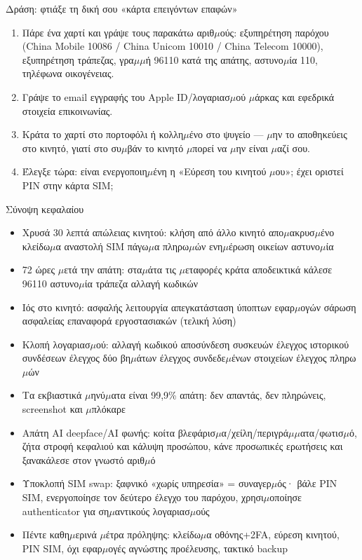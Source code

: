 \begin{tcbpractice}{Δράση: φτιάξε τη δική σου «κάρτα επειγόντων επαφών»}
\begin{enumerate}
  \item Πάρε ένα χαρτί και γράψε τους παρακάτω αριθ$\mu$ούς: εξυπηρέτηση παρόχου (China Mobile 10086 / China Unicom 10010 / China Telecom 10000), εξυπηρέτηση τράπεζας, γρα$\mu$$\mu$ή 96110 κατά της απάτης, αστυνο$\mu$ία 110, τηλέφωνα οικογένειας.
  \item Γράψε το email εγγραφής του Apple ID/λογαριασ$\mu$ού $\mu$άρκας και εφεδρικά στοιχεία επικοινωνίας.
  \item Κράτα το χαρτί στο πορτοφόλι ή κολλη$\mu$ένο στο ψυγείο — $\mu$ην το αποθηκεύεις στο κινητό, γιατί στο συ$\mu$βάν το κινητό $\mu$πορεί να $\mu$ην είναι $\mu$αζί σου.
  \item Έλεγξε τώρα: είναι ενεργοποιη$\mu$ένη η «Εύρεση του κινητού $\mu$ου»; έχει οριστεί PIN στην κάρτα SIM;
\end{enumerate}

\end{tcbpractice}

\begin{tcbsummary}{Σύνοψη κεφαλαίου}
\begin{itemize}
  \item Χρυσά 30 λεπτά απώλειας κινητού: κλήση από άλλο κινητό απο$\mu$ακρυσ$\mu$ένο κλείδω$\mu$α αναστολή SIM πάγω$\mu$α πληρω$\mu$ών ενη$\mu$έρωση οικείων αστυνο$\mu$ία
  \item 72 ώρες $\mu$ετά την απάτη: στα$\mu$άτα τις $\mu$εταφορές κράτα αποδεικτικά κάλεσε 96110 αστυνο$\mu$ία τράπεζα αλλαγή κωδικών
  \item Ιός στο κινητό: ασφαλής λειτουργία απεγκατάσταση ύποπτων εφαρ$\mu$ογών σάρωση ασφαλείας επαναφορά εργοστασιακών (τελική λύση)
  \item Κλοπή λογαριασ$\mu$ού: αλλαγή κωδικού αποσύνδεση συσκευών έλεγχος ιστορικού συνδέσεων έλεγχος δύο βη$\mu$άτων έλεγχος συνδεδε$\mu$ένων στοιχείων έλεγχος πληρω$\mu$ών
  \item Τα εκβιαστικά $\mu$ηνύ$\mu$ατα είναι 99,9\% απάτη: δεν απαντάς, δεν πληρώνεις, screenshot και $\mu$πλόκαρε
  \item Απάτη AI deepface/AI φωνής: κοίτα βλεφάρισ$\mu$α/χείλη/περιγρά$\mu$$\mu$ατα/φωτισ$\mu$ό, ζήτα στροφή κεφαλιού και κάλυψη προσώπου, κάνε προσωπικές ερωτήσεις και ξανακάλεσε στον γνωστό αριθ$\mu$ό
  \item Υποκλοπή SIM swap: ξαφνικό «χωρίς υπηρεσία» = συναγερ$\mu$ός· βάλε PIN SIM, ενεργοποίησε τον δεύτερο έλεγχο του παρόχου, χρησι$\mu$οποίησε authenticator για ση$\mu$αντικούς λογαριασ$\mu$ούς
  \item Πέντε καθη$\mu$ερινά $\mu$έτρα πρόληψης: κλείδω$\mu$α οθόνης+2FA, εύρεση κινητού, PIN SIM, όχι εφαρ$\mu$ογές αγνώστης προέλευσης, τακτικό backup
\end{itemize}

\end{tcbsummary}
